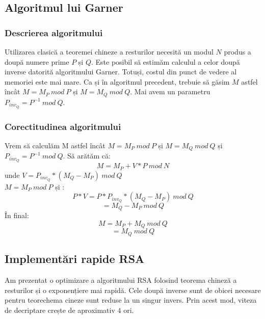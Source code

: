 \documentclass[12]{report}
\begin{document}
	 \subsection{Algoritmul lui Garner}
	  \subsubsection{Descrierea algoritmului}
	  Utilizarea clasică a teoremei chineze a resturilor necesită un modul $N$ produs a doupă numere prime $P$ și $Q$. Este posibil să estimăm calculul a celor doupă inverse datorită algoritmului Garner. Totuși, costul din punct de vedere al memoriei este mai mare. Ca și în algoritmul precedent, trebuie să găsim $M$ astfel încât $ M = M_P \ mod \ P$ și $M = M_Q \ mod \ Q$. Mai avem un parametru $ P_{inv_Q} = P^{-1} \ mod \ Q$.
	  \subsubsection{Corectitudinea algoritmului}
	  Vrem să calculăm M astfel încât $M =M_P \ mod \ P$ și $M=M_Q \ mod \ Q$ și $P_{inv_Q}=P^{-1} \ mod \ Q$. Să arătăm că: \\
	  $$ M=M_P + V*P \ mod \ N$$
	  unde $ V=P_{inv_Q} * (M_Q-M_P) \ mod \ Q$ \\
	  $M = M_P \ mod \ P$ și : \\
	  $$P*V= P* P_{inv_Q} * (M_Q - M_P) \ mod \ Q$$
	  $$ = M_Q - M_P \ mod \ Q$$
	  În final: \\
	  $$ M= M_P + M_Q \ mod \ Q$$
	  $$ = M_Q \ mod \ Q $$
	  
	  \subsection{Implementări rapide RSA}
	  Am prezentat o optimizare a algoritmului RSA folosind teorema chineză a resturilor și o exponențiere mai rapidă. Cele doupă inverse sunt de obicei necesare pentru teorechema cineze sunt reduse la un singur invers. Prin acest mod, viteza de decriptare crește de aproximativ $4$ ori.
\end{document}

